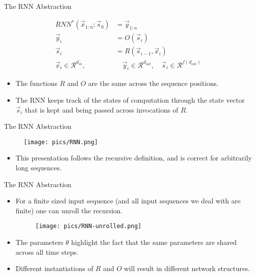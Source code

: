 \documentclass[handout]{beamer}
\begin{document}
\begin{frame}{The RNN Abstraction}
\begin{scriptsize}

\begin{equation}
\begin{split}
 RNN^{*}(\vec{x}_{1:n};\vec{s}_0) & = \vec{y}_{1:n} \\
\vec{y}_i & = O(\vec{s}_i) \\
\vec{s}_i & = R(\vec{s}_{i-1},\vec{x}_i) \\
\vec{x}_i \in \mathcal{R}^{d_{in}}, & \quad \vec{y}_i \in \mathcal{R}^{d_{out}}, \quad \vec{s}_i \in \mathcal{R}^{f(d_{out})}
\end{split}
\end{equation}
\begin{itemize}
\item The functions $R$ and $O$ are the same across the sequence positions. 
\item The RNN keeps track of the states of computation through the state vector $\vec{s}_i$ that is kept and being passed across invocations of $R$.


\end{itemize}
\end{scriptsize}
\end{frame}




\begin{frame}{The RNN Abstraction}
\begin{scriptsize}

  \begin{figure}[h]
        	\texttt{[image: pics/RNN.png]}
        \end{figure}
\begin{itemize}
\item This presentation follows the recursive definition, and is correct for arbitrarily long sequences.
\end{itemize}
\end{scriptsize}
\end{frame}




\begin{frame}{The RNN Abstraction}
\begin{scriptsize}
\begin{itemize}
\item For a finite sized input sequence (and all input sequences we deal with are finite) one can unroll the recursion.
  \begin{figure}[h]
        	\texttt{[image: pics/RNN-unrolled.png]}
        \end{figure}

        
\item The parameters $\theta$ highlight the fact that the same parameters are shared across all time steps. 
\item Different instantiations of $R$ and $O$ will result in different network structures.
\end{itemize}
\end{scriptsize}
\end{frame}
\end{document}
